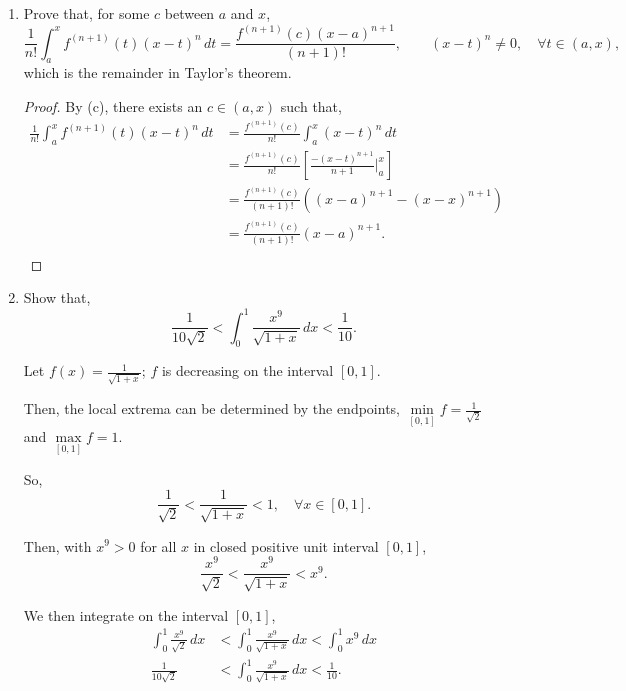 \documentclass[../hw4]{subfiles}
\begin{document}
\begin{enumerate}[label= (\alph*)]
    \item Prove that, for some $c$ between $a$ and $x$,
    \[\frac{1}{n!}\int_{a}^{x}f^{(n+1)}(t){(x-t)}^n\,dt=\frac{f^{(n+1)}(c){(x-a)}^{n+1}}{(n+1)!}, \qquad {(x-t)}^n\neq0, \quad\forall t\in(a,x),\]
    which is the remainder in Taylor's theorem.

    \begin{proof}
        By (c), there exists an $c\in(a,x)$ such that,
        \begin{align*}
            \frac{1}{n!}\int_{a}^{x}f^{(n+1)}(t){(x-t)}^n\,dt&=\frac{f^{(n+1)}(c)}{n!}\int_{a}^{x}{(x-t)}^n\,dt \\
            &= \frac{f^{(n+1)}(c)}{n!}\left[ \frac{{-(x-t)}^{n+1}}{n+1}\Bigg\vert_{a}^{x} \right] \\
            &= \frac{f^{(n+1)}(c)}{(n+1)!}\left( {(x-a)}^{n+1} - {(x-x)}^{n+1} \right) \\
            &= \frac{f^{(n+1)}(c)}{(n+1)!}{(x-a)}^{n+1}. \\
        \end{align*}
    \end{proof}

    \item Show that, \[\frac{1}{10\sqrt{2}}<\int_{0}^{1}\frac{x^9}{\sqrt{1+x}}\,dx<\frac{1}{10}.\]
    
    
    Let $f(x)=\frac{1}{\sqrt{1+x}}$; $f$ is decreasing on the interval $[0,1]$.

    Then, the local extrema can be determined by the endpoints, $\underset{[0,1]}{\min}f = \frac{1}{\sqrt{2}}$ and $\underset{[0,1]}{\max}f = 1$.

    So, \[\frac{1}{\sqrt{2}} < \frac{1}{\sqrt{1+x}} < 1, \quad \forall x \in [0,1].\]

    Then, with $x^9>0$ for all $x$ in closed positive unit interval $[0,1]$,
    \[\frac{x^9}{\sqrt{2}}<\frac{x^9}{\sqrt{1+x}}<x^9.\]

    We then integrate on the interval $[0,1]$,
    \begin{align*}
        \int_{0}^{1}\frac{x^9}{\sqrt{2}}\,dx&<\int_{0}^{1}\frac{x^9}{\sqrt{1+x}}\,dx<\int_{0}^{1}x^9\,dx\\
        \frac{1}{10\sqrt{2}}&<\int_{0}^{1}\frac{x^9}{\sqrt{1+x}}\,dx<\frac{1}{10}.
    \end{align*}

\end{enumerate}
\end{document}
